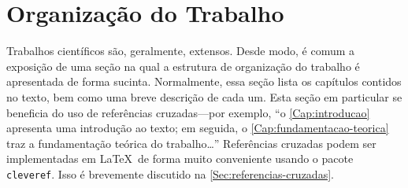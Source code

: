\section{Organização do Trabalho}
Trabalhos científicos são, geralmente, extensos. Desde modo, é comum a exposição de uma seção na qual a estrutura de organização do trabalho é apresentada de forma sucinta. Normalmente, essa seção lista os capítulos contidos no texto, bem como uma breve descrição de cada um. Esta seção em particular se beneficia do uso de referências cruzadas---por exemplo, ``o \cref{Cap:introducao} apresenta uma introdução ao texto; em seguida, o \cref{Cap:fundamentacao-teorica} traz a fundamentação teórica do trabalho\ldots'' Referências cruzadas podem ser implementadas em \LaTeX\ de forma muito conveniente usando o pacote \texttt{cleveref}. Isso é brevemente discutido na \cref{Sec:referencias-cruzadas}.


